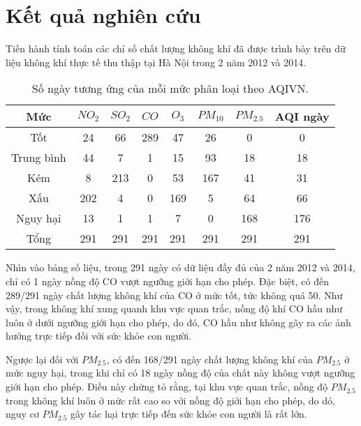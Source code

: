 \documentclass[14pt]{extreport}
\theoremstyle{definition}
\theoremstyle{plain}
\theoremstyle{remark}
\begin{document}
\chapter{Kết quả nghiên cứu}
Tiến hành tính toán các chỉ số chất lượng không khí đã được trình bày trên dữ liệu không khí thực tế thu thập tại Hà Nội trong 2 năm 2012 và 2014.

\begin{table}
\begin{tabular}{|c|c|c|c|c|c|c|c|} 
 \hline
 Mức &\hspace{0.05cm} $NO_2$ \hspace{0.05cm}& \hspace{0.05cm} $SO_2$ \hspace{0.05cm} & \hspace{0.05cm} $CO$\hspace{0.1cm} & \hspace{0.1cm} $O_3$ \hspace{0.1cm} & $PM_{10}$ & $PM_{2.5}$& AQI ngày\\
 \hline \hline
 Tốt	&	24	&	66	&	289	& 47 & 26	&	0 & 0\\\hline
Trung bình & 44 & 7 & 1 & 15 & 93 & 18 & 18\\\hline
Kém & 8 & 213 & 0 & 53 & 167 & 41 & 31\\\hline
Xấu & 202 & 4 & 0 & 169 & 5 & 64 & 66\\\hline
Nguy hại & 13 & 1 & 1 & 7 & 0 & 168 & 176\\\hline
Tổng & 291 & 291 & 291 & 291 & 291 & 291 & 291\\\hline
\end{tabular}
\caption{Số ngày tương ứng của mỗi mức phân loại theo AQIVN.}
\end{table}

Nhìn vào bảng số liệu, trong 291 ngày có dữ liệu đầy đủ của 2 năm 2012 và 2014, chỉ có 1 ngày nồng độ CO vượt ngưỡng giới hạn cho phép. Đặc biệt, có đến 289/291 ngày chất lượng không khí của CO ở mức tốt, tức không quá 50. Như vậy, trong không khí xung quanh khu vực quan trắc, nồng độ khí CO hầu như luôn ở dưới ngưỡng giới hạn cho phép, do đó, CO hầu như không gây ra các ảnh hưởng trực tiếp đối với sức khỏe con người. 

Ngược lại đối với $PM_{2.5}$, có đến 168/291 ngày chất lượng không khí của $PM_{2.5}$ ở mức nguy hại, trong khi chỉ có 18 ngày nồng độ của chất này không vượt ngưỡng giới hạn cho phép. Điều này chứng tỏ rằng, tại khu vực quan trắc, nồng độ $PM_{2.5}$ trong không khí luôn ở mức rất cao so với nồng độ giới hạn cho phép, do dó, nguy cơ $PM_{2.5}$ gây tác hại trực tiếp đến sức khỏe con người là rất lớn. 
\end{document}
